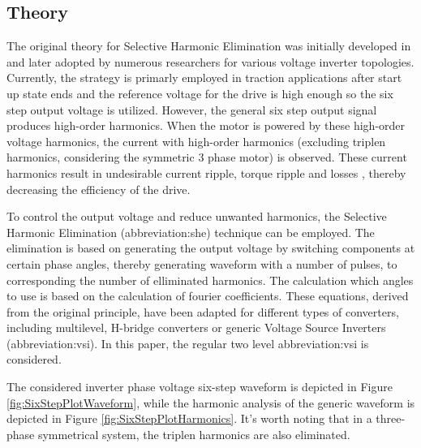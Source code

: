 \documentclass[a4paper, twoside, 11pt]{article}
\begin{document}
    \subsection{Theory}\label{subsec:she-theory}
    The original theory for Selective Harmonic Elimination was initially developed in \cite{patel-Generalized-Techniques-of-Harmonic-Elimination-and-Voltage-Control-in-Thyristor-Inverters:-Part-I--Harmonic-Elimination, patel-Generalized-Techniques-of-Harmonic-Elimination-and-Voltage-Control-in-Thyristor-Inverters:-Part-II-----Voltage-Control-Techniques} and later adopted by numerous researchers for various voltage inverter topologies. Currently, the strategy is primarly employed in traction applications after start up state ends and the reference voltage for the drive is high enough so the six step output voltage is utilized. However, the general six step output signal produces high-order harmonics. When the motor is powered by these high-order voltage harmonics, the current with high-order harmonics (excluding triplen harmonics, considering the symmetric 3 phase motor) is observed. These current harmonics result in undesirable current ripple, torque ripple and losses \cite{mullner-Modelling-and-precalculation-of-additional-losses-of-inverter-fed-asynchronous-induction-machines-for-traction-applications}, thereby decreasing the efficiency of the drive.\par
    To control the output voltage and reduce unwanted harmonics, the Selective Harmonic Elimination (\gls{abbreviation:she}) technique can be employed. The elimination is based on generating the output voltage by switching components at certain phase angles, thereby generating waveform with a number of pulses, to corresponding the number of elliminated harmonics. The calculation which angles to use is based on the calculation of fourier coefficients. These equations, derived from the original principle, have been adapted for different types of converters, including multilevel, H-bridge converters or generic Voltage Source Inverters (\gls{abbreviation:vsi}). In this paper, the regular two level \gls{abbreviation:vsi} is considered.\par
    The considered inverter phase voltage six-step waveform is depicted in Figure \ref{fig:SixStepPlotWaveform}, while the harmonic analysis of the generic waveform is depicted in Figure \ref{fig:SixStepPlotHarmonics}.  It's worth noting that in a three-phase symmetrical system, the triplen harmonics are also eliminated.
\end{document}
